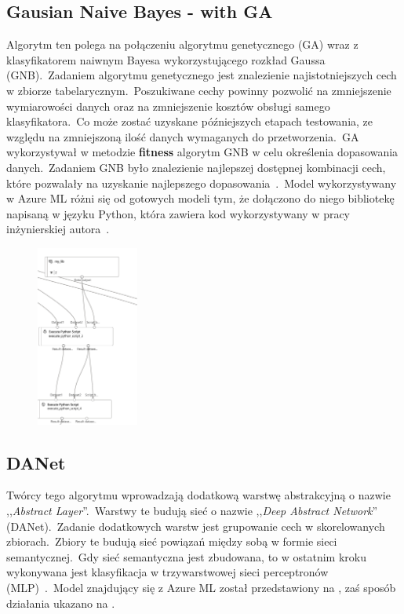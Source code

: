 \subsection{Gausian Naive Bayes - with GA}
Algorytm ten polega na połączeniu algorytmu genetycznego (GA) wraz z klasyfikatorem naiwnym Bayesa wykorzystującego rozkład Gaussa (GNB).\ Zadaniem algorytmu genetycznego jest znalezienie najistotniejszych cech w zbiorze tabelarycznym.\ Poszukiwane cechy powinny pozwolić na zmniejszenie wymiarowości danych oraz na zmniejszenie kosztów obsługi samego klasyfikatora.\ Co może zostać uzyskane późniejszych etapach testowania, ze względu na zmniejszoną ilość danych wymaganych do przetworzenia.\ GA wykorzystywał w metodzie \textbf{fitness} algorytm GNB w celu określenia dopasowania danych.\ Zadaniem GNB było znalezienie najlepszej dostępnej kombinacji cech, które pozwalały na uzyskanie najlepszego dopasowania~\cite{Blyszcz2022}.\ Model wykorzystywany w Azure ML różni się od gotowych modeli tym, że dołączono do niego bibliotekę napisaną w języku Python, która zawiera kod wykorzystywany w pracy inżynierskiej autora~\cite{Suvres2023}.
\begin{figure}[H]
    \centering
    \includegraphics[width=0.3\textwidth]{images/ga_pipe}
    \label{fig:ga-pipe}
\end{figure}

\vfill
\pagebreak

\subsection{DANet}
Twórcy tego algorytmu wprowadzają dodatkową warstwę abstrakcyjną o nazwie ,,\textit{Abstract Layer}''.\ Warstwy te budują sieć o nazwie ,,\textit{Deep Abstract Network}'' (DANet).\ Zadanie dodatkowych warstw jest grupowanie cech w skorelowanych zbiorach.\ Zbiory te budują sieć powiązań między sobą w formie sieci semantycznej.\ Gdy sieć semantyczna jest zbudowana, to w ostatnim kroku wykonywana jest klasyfikacja w trzywarstwowej sieci perceptronów  (MLP)~\cite{Chen2022, Danet}.\ Model znajdujący się z Azure ML został przedstawiony na , zaś sposób działania ukazano na .


